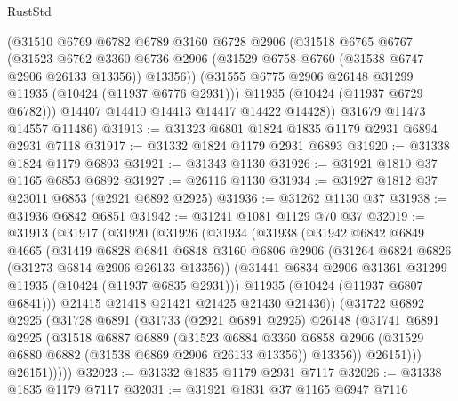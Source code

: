 \begin{lexlean}{RustStd}
\begin{coremodule}
          (@31510
            @6769
            @6782
            @6789
            @3160
            @6728
            @2906
            (@31518
              @6765
              @6767
              (@31523
                @6762
                @3360
                @6736
                @2906
                (@31529 @6758 @6760 (@31538 @6747 @2906 @26133 @13356))
                @13356))
            (@31555 @6775 @2906 @26148 @31299 @11935 (@10424 (@11937 @6776 @2931)))
            @11935
            (@10424 (@11937 @6729 @6782)))
          @14407
          @14410
          @14413
          @14417
          @14422
          @14428))
      @31679
      @11473
      @14557
      @11486)
@31913 := @31323 @6801 @1824 @1835 @1179 @2931 @6894 @2931 @7118
@31917 := @31332 @1824 @1179 @2931 @6893
@31920 := @31338 @1824 @1179 @6893
@31921 := @31343 @1130
@31926 := @31921 @1810 @37 @1165 @6853 @6892
@31927 := @26116 @1130
@31934 := @31927 @1812 @37 @23011 @6853 (@2921 @6892 @2925)
@31936 := @31262 @1130 @37
@31938 := @31936 @6842 @6851
@31942 := @31241 @1081 @1129 @70 @37
@32019 := @31913
    (@31917
      (@31920
        (@31926
          (@31934
            (@31938
              (@31942
                @6842
                @6849
                @4665
                (@31419
                  @6828
                  @6841
                  @6848
                  @3160
                  @6806
                  @2906
                  (@31264 @6824 @6826 (@31273 @6814 @2906 @26133 @13356))
                  (@31441 @6834 @2906 @31361 @31299 @11935 (@10424 (@11937 @6835 @2931)))
                  @11935
                  (@10424 (@11937 @6807 @6841)))
                @21415
                @21418
                @21421
                @21425
                @21430
                @21436))
            (@31722
              @6892
              @2925
              (@31728
                @6891
                (@31733
                  (@2921 @6891 @2925)
                  @26148
                  (@31741
                    @6891
                    @2925
                    (@31518
                      @6887
                      @6889
                      (@31523
                        @6884
                        @3360
                        @6858
                        @2906
                        (@31529 @6880 @6882 (@31538 @6869 @2906 @26133 @13356))
                        @13356))
                    @26151)))
              @26151)))))
@32023 := @31332 @1835 @1179 @2931 @7117
@32026 := @31338 @1835 @1179 @7117
@32031 := @31921 @1831 @37 @1165 @6947 @7116

\end{coremodule}
\end{lexlean}
